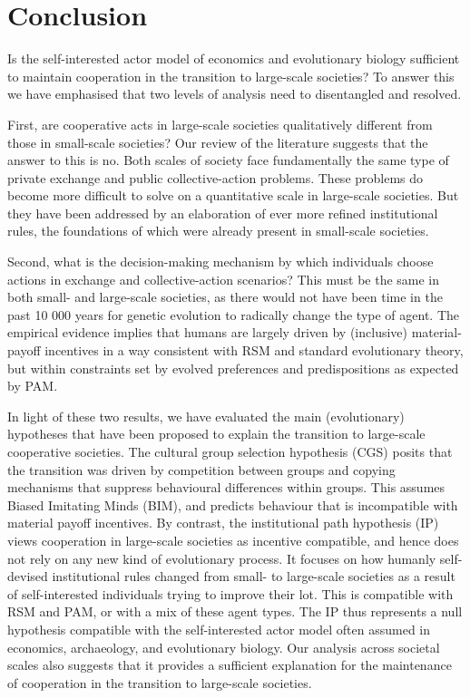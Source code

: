 \documentclass[10pt, a4paper, fleqn]{article}
\begin{document}
\section*{Conclusion}

Is the self-interested actor model of economics and evolutionary biology sufficient to maintain cooperation in the transition to large-scale societies? To answer this we have emphasised that two levels of analysis need to disentangled and resolved.

First, are cooperative acts in large-scale societies qualitatively different from those in small-scale societies? Our review of the literature suggests that the answer to this is no. Both scales of society face fundamentally the same type of private exchange and public collective-action problems. These problems do become more difficult to solve on a quantitative scale in large-scale societies. But they have been addressed by an elaboration of ever more refined institutional rules, the foundations of which were already present in small-scale societies. 

Second, what is the decision-making mechanism by which individuals choose actions in exchange and collective-action scenarios? This must be the same in both small- and large-scale societies, as there would not have been time in the past 10 000 years for genetic evolution to radically change the type of agent. The empirical evidence implies that humans are largely driven by (inclusive) material-payoff incentives in a way consistent with RSM and standard evolutionary theory, but within constraints set by evolved preferences and predispositions as expected by PAM.

In light of these two results, we have evaluated the main (evolutionary) hypotheses that have been proposed to explain the transition to large-scale cooperative societies. The cultural group selection hypothesis (CGS) posits that the transition was driven by competition between groups and copying mechanisms that suppress behavioural differences within groups. This assumes Biased Imitating Minds (BIM), and predicts behaviour that is incompatible with material payoff incentives. By contrast, the institutional path hypothesis (IP) views cooperation in large-scale societies as incentive compatible, and hence does not rely on any new kind of evolutionary process. It focuses on how humanly self-devised institutional rules changed from small- to large-scale societies as a result of self-interested individuals trying to improve their lot. This is compatible with RSM and PAM, or with a mix of these agent types. The IP thus represents a null hypothesis compatible with the self-interested actor model often assumed in economics, archaeology, and evolutionary biology. Our analysis across societal scales also suggests that it provides a sufficient explanation for the maintenance of cooperation in the transition to large-scale societies.
\end{document}
